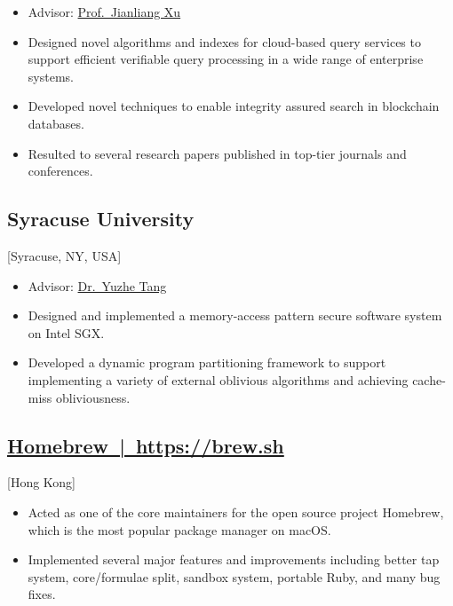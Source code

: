 \documentclass{mycv}
\begin{document}
\begin{itemize}
  \item Advisor: \href{https://www.comp.hkbu.edu.hk/~xujl}{Prof.~Jianliang Xu}
  \item Designed novel algorithms and indexes for cloud-based query services to support efficient verifiable query processing in a wide range of enterprise systems.
  \item Developed novel techniques to enable integrity assured search in blockchain databases.
  \item Resulted to several research papers published in top-tier journals and conferences.
\end{itemize}

\subsection{Syracuse University}[Syracuse, NY, USA]
\begin{positions}
\end{positions}

\begin{itemize}
  \item Advisor: \href{https://tristartom.github.io}{Dr.~Yuzhe Tang}
  \item Designed and implemented a memory-access pattern secure software system on Intel SGX\@.
  \item Developed a dynamic program partitioning framework to support implementing a variety of external oblivious algorithms and achieving cache-miss obliviousness.
\end{itemize}

\subsection{\href{https://brew.sh}{Homebrew~|~https://brew.sh}}[Hong Kong]
\begin{positions}
\end{positions}

\begin{itemize}
  \item Acted as one of the core maintainers for the open source project Homebrew, which is the most popular package manager on macOS\@.
  \item Implemented several major features and improvements including better tap system, core/formulae split, sandbox system, portable Ruby, and many bug fixes.
\end{itemize}
\end{document}
